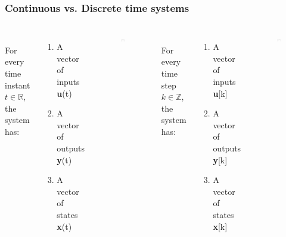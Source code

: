 \documentclass{beamer}
\begin{document}
	\begin{frame}
		\frametitle{Continuous vs. Discrete time systems}
		\vspace{-2ex}
		\begin{columns}[c] 
			
			\\
			For every time instant $t \in \mathds{R}$, the system has: 
			\begin{enumerate}
				\item A vector of inputs \textbf{u}(t)
				\item A vector of outputs \textbf{y}(t)
				\item A vector of states \textbf{x}(t)
			\end{enumerate}
			\begin{figure}
				\includegraphics[width=0.8\linewidth]{continuous}
			\end{figure}
			
			\\
			For every time step $k \in \mathds{Z}$, the system has: 
			\begin{enumerate}
				\item A vector of inputs \textbf{u}[k]
				\item A vector of outputs \textbf{y}[k]
				\item A vector of states \textbf{x}[k]
			\end{enumerate}
			\begin{figure}
				\includegraphics[width=0.8\linewidth]{discrete}
			\end{figure}
			
		\end{columns}
	\end{frame}
	
\end{document}
